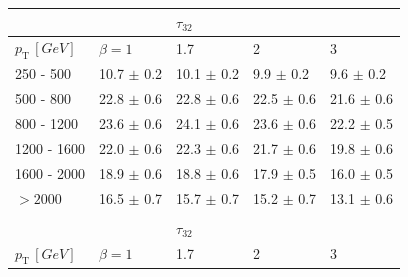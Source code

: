 \begin{table}[H]
\begin{tabular}{lllll}
\rowcolor{Gray} \multicolumn{1}{l||}{\textbf{TAS}}            &                                & $\tau_{32}$               &                           & \multicolumn{1}{l|}{}     \\ \hline
\multicolumn{1}{l||}{$p_{\mathrm{T}} \, [GeV]$} & \multicolumn{1}{l|}{\cellcolor{Gray2}$\beta=1$} & \multicolumn{1}{l|}{\cellcolor{Gray2}1.7}  & \multicolumn{1}{l|}{\cellcolor{Gray2}2}    & \multicolumn{1}{l|}{\cellcolor{Gray2}3}    \\ \hline \hline
\multicolumn{1}{l||}{250 - 500}      & \multicolumn{1}{l|}{\cellcolor{Red!50}10.7 $\pm$ 0.2}      	& \multicolumn{1}{l|}{10.1 $\pm$ 0.2} 					& \multicolumn{1}{l|}{9.9 $\pm$ 0.2}  & \multicolumn{1}{l|}{9.6 $\pm$ 0.2}  \\
\multicolumn{1}{l||}{500 - 800}      & \multicolumn{1}{l|}{\cellcolor{Red!50}22.8 $\pm$ 0.6}      	& \multicolumn{1}{l|}{\cellcolor{Red!50}22.8 $\pm$ 0.6} & \multicolumn{1}{l|}{22.5 $\pm$ 0.6} & \multicolumn{1}{l|}{21.6 $\pm$ 0.6} \\
\multicolumn{1}{l||}{800 - 1200}     & \multicolumn{1}{l|}{23.6 $\pm$ 0.6}      					& \multicolumn{1}{l|}{\cellcolor{Red!50}24.1 $\pm$ 0.6} & \multicolumn{1}{l|}{23.6 $\pm$ 0.6} & \multicolumn{1}{l|}{22.2 $\pm$ 0.5} \\
\multicolumn{1}{l||}{1200 - 1600}    & \multicolumn{1}{l|}{22.0 $\pm$ 0.6}      					& \multicolumn{1}{l|}{\cellcolor{Red!50}22.3 $\pm$ 0.6} & \multicolumn{1}{l|}{21.7 $\pm$ 0.6} & \multicolumn{1}{l|}{19.8 $\pm$ 0.6} \\
\multicolumn{1}{l||}{1600 - 2000}    & \multicolumn{1}{l|}{\cellcolor{Red!50}18.9 $\pm$ 0.6}      	& \multicolumn{1}{l|}{18.8 $\pm$ 0.6} 					& \multicolumn{1}{l|}{17.9 $\pm$ 0.5} & \multicolumn{1}{l|}{16.0 $\pm$ 0.5} \\
\multicolumn{1}{l||}{$>2000$}        & \multicolumn{1}{l|}{\cellcolor{Red!50}16.5 $\pm$ 0.7}      	& \multicolumn{1}{l|}{15.7 $\pm$ 0.7} 					& \multicolumn{1}{l|}{15.2 $\pm$ 0.7} & \multicolumn{1}{l|}{13.1 $\pm$ 0.6} \\ \hline
                                    &                                &                           &                           &                           \\
\rowcolor{Gray} \multicolumn{1}{l||}{\textbf{Tracks}}         &                                & $\tau_{32}$               &                           & \multicolumn{1}{l|}{}     \\ \hline
\multicolumn{1}{l||}{$p_{\mathrm{T}} \, [GeV]$} & \multicolumn{1}{l|}{\cellcolor{Gray2}$\beta=1$} & \multicolumn{1}{l|}{\cellcolor{Gray2}1.7}  & \multicolumn{1}{l|}{\cellcolor{Gray2}2}    & \multicolumn{1}{l|}{\cellcolor{Gray2}3}    \\ \hline \hline

\end{tabular}
\end{table}
